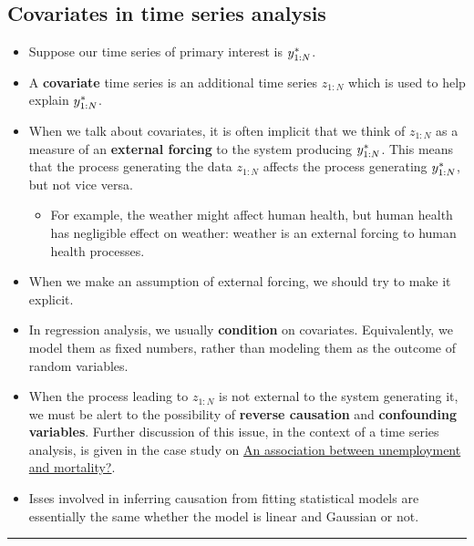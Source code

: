 \documentclass[]{article}
\providecommand{\tightlist}{%
  \setlength{\itemsep}{0pt}\setlength{\parskip}{0pt}}
\begin{document}
\subsection{Covariates in time series
analysis}\label{covariates-in-time-series-analysis}

\begin{itemize}
\item
  Suppose our time series of primary interest is \(y_{1:N}^*\).
\item
  A \textbf{covariate} time series is an additional time series
  \({z_{1:N}}\) which is used to help explain \(y_{1:N}^*\).
\item
  When we talk about covariates, it is often implicit that we think of
  \({z_{1:N}}\) as a measure of an \textbf{external forcing} to the
  system producing \(y_{1:N}^*\). This means that the process
  generating the data \({z_{1:N}}\) affects the process generating
  \(y_{1:N}^*\), but not vice versa.

  \begin{itemize}
  \tightlist
  \item
    For example, the weather might affect human health, but human health
    has negligible effect on weather: weather is an external forcing to
    human health processes.
  \end{itemize}
\item
  When we make an assumption of external forcing, we should try to make
  it explicit.
\item
  In regression analysis, we usually \textbf{condition} on covariates.
  Equivalently, we model them as fixed numbers, rather than modeling
  them as the outcome of random variables.
\item
  When the process leading to \({z_{1:N}}\) is not external to the
  system generating it, we must be alert to the possibility of
  \textbf{reverse causation} and \textbf{confounding variables}. Further
  discussion of this issue, in the context of a time series analysis, is
  given in the case study on
  \href{http://ionides.github.io/531w16/notes10/notes10.html\#conclusions}{An
  association between unemployment and mortality?}.
\item
  Isses involved in inferring causation from fitting statistical models
  are essentially the same whether the model is linear and Gaussian or
  not.
\end{itemize}

\begin{center}\rule{0.5\linewidth}{\linethickness}\end{center}
\end{document}
